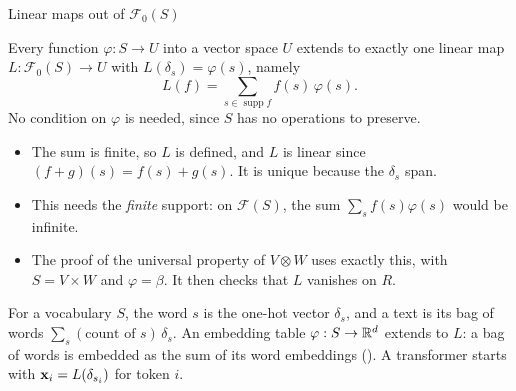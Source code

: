 \documentclass[aspectratio=1610,11pt]{beamer}
\begin{document}
\begin{frame}{Linear maps out of $\mathcal{F}_0(S)$}
    \begin{proposition}
        \small Every function $\varphi: S \to U$ into a vector space $U$ extends to exactly one linear map $L: \mathcal{F}_0(S) \to U$ with $L(\delta_s) = \varphi(s)$, namely
        \[L(f) = \sum_{s \in \operatorname{supp} f} f(s)\,\varphi(s).\]
        No condition on $\varphi$ is needed, since $S$ has no operations to preserve.
    \end{proposition}
    \small
    \begin{itemize}
        \item The sum is finite, so $L$ is defined, and $L$ is linear since $(f + g)(s) = f(s) + g(s)$. It is unique because the $\delta_s$ span.
        \item This needs the \emph{finite} support: on $\mathcal{F}(S)$, the sum $\sum_s f(s)\varphi(s)$ would be infinite.
        \item The proof of the universal property of $V \otimes W$ uses exactly this, with $S = V \times W$ and $\varphi = \beta$. It then checks that $L$ vanishes on $R$.
    \end{itemize}
    \begin{mlbox}
        \small For a vocabulary $S$, the word $s$ is the one-hot vector $\delta_s$, and a text is its bag of words $\sum_s (\text{count of } s)\,\delta_s$. An embedding table $\varphi: S \to \mathbb{R}^d$ extends to $L$: a bag of words is embedded as the sum of its word embeddings (). A transformer starts with $\mathbf{x}_i = L(\delta_{s_i})$ for token $i$.
    \end{mlbox}
\end{frame}
\end{document}
